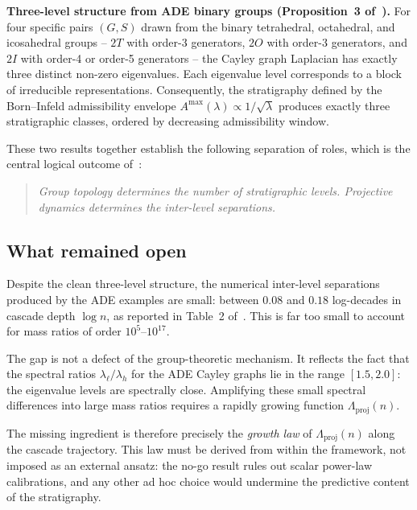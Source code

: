     \medskip
    \noindent\textbf{Three-level structure from ADE binary groups
  (Proposition~3 of~\cite{Beau2026a4}).}
    For four specific pairs $(G, S)$ drawn from the binary tetrahedral, octahedral,
    and icosahedral groups -- $2T$ with order-3 generators, $2O$ with order-3
    generators, and $2I$ with order-4 or order-5 generators -- the Cayley graph
    Laplacian has exactly three distinct non-zero eigenvalues.
    Each eigenvalue level corresponds to a block of irreducible representations.
    Consequently, the stratigraphy defined by the Born--Infeld admissibility
    envelope $A^{\max}(\lambda) \propto 1/\sqrt{\lambda}$ produces exactly three
    stratigraphic classes, ordered by decreasing admissibility window.

    These two results together establish the following separation of roles, which
    is the central logical outcome of~\cite{Beau2026a4}:
    \begin{quote}
      \emph{Group topology determines the number of stratigraphic levels.
      Projective dynamics determines the inter-level separations.}
    \end{quote}

  \subsection{What remained open}
    \label{sec:intro:open}

    Despite the clean three-level structure, the numerical inter-level separations
    produced by the ADE examples are small: between $0.08$ and $0.18$ log-decades
    in cascade depth $\log n$, as reported in Table~2 of~\cite{Beau2026a4}.
    This is far too small to account for mass ratios of order $10^5$--$10^{17}$.

    The gap is not a defect of the group-theoretic mechanism.
    It reflects the fact that the spectral ratios $\lambda_\ell / \lambda_h$ for
    the ADE Cayley graphs lie in the range $[1.5, 2.0]$: the eigenvalue levels are
    spectrally close.
    Amplifying these small spectral differences into large mass ratios requires a
    rapidly growing function $\Lambda_{\mathrm{proj}}(n)$.

    The missing ingredient is therefore precisely the \emph{growth law} of
    $\Lambda_{\mathrm{proj}}(n)$ along the cascade trajectory.
    This law must be derived from within the framework, not imposed as an external
    ansatz: the no-go result rules out scalar power-law calibrations, and any
    other ad hoc choice would undermine the predictive content of the stratigraphy.


